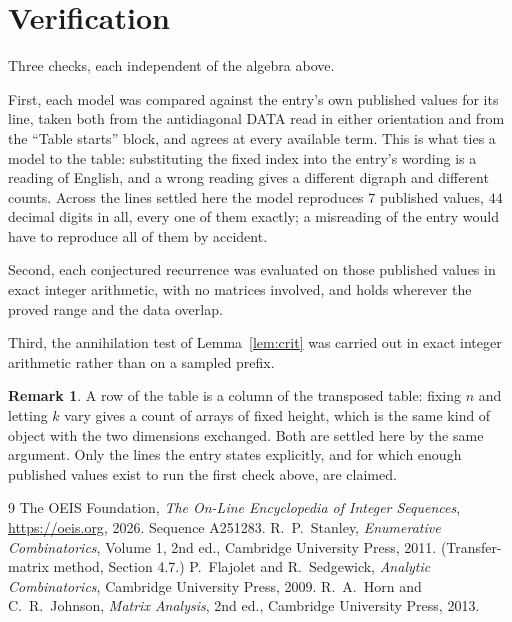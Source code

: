 \documentclass[11pt,a4paper]{article}
\theoremstyle{plain}
\theoremstyle{definition}
\newtheorem{remark}[theorem]{Remark}
\begin{document}
\section{Verification}

Three checks, each independent of the algebra above.

First, each model was compared against the entry's own published values for its line, taken
both from the antidiagonal DATA read in either orientation and from the ``Table starts''
block, and agrees at every available term. This is what ties a model to the table:
substituting the fixed index into the entry's wording is a reading of English, and a wrong
reading gives a different digraph and different counts. Across the lines settled here the
model reproduces $7$ published values, $44$ decimal digits in all, every one of
them exactly; a misreading of the entry would have to reproduce all of them by accident.

Second, each conjectured recurrence was evaluated on those published values in exact
integer arithmetic, with no matrices involved, and holds wherever the proved range and the
data overlap.

Third, the annihilation test of Lemma~\ref{lem:crit} was carried out in exact integer
arithmetic rather than on a sampled prefix.

\begin{remark}
A row of the table is a column of the transposed table: fixing $n$ and letting $k$ vary gives a
count of arrays of fixed height, which is the same kind of object with the two dimensions
exchanged. Both are settled here by the same argument. Only the lines the entry states
explicitly, and for which enough published values exist to run the first check above, are
claimed.
\end{remark}

\begin{thebibliography}{9}
 The OEIS Foundation, \emph{The On-Line Encyclopedia of Integer
Sequences}, \url{https://oeis.org}, 2026. Sequence A251283.
 R.~P.~Stanley, \emph{Enumerative Combinatorics}, Volume 1, 2nd ed.,
Cambridge University Press, 2011. (Transfer-matrix method, Section 4.7.)
 P.~Flajolet and R.~Sedgewick, \emph{Analytic Combinatorics}, Cambridge
University Press, 2009.
 R.~A.~Horn and C.~R.~Johnson, \emph{Matrix Analysis}, 2nd ed., Cambridge
University Press, 2013.
\end{thebibliography}
\end{document}
